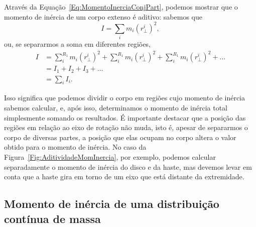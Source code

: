 Através da Equação~\ref{Eq:MomentoInerciaConjPart}, podemos mostrar que o momento de inércia de um corpo extenso é aditivo: sabemos que
\begin{equation}
    I = \sum_i m_i (r_\perp^i)^2,
\end{equation}
%
ou, se separarmos a soma em diferentes regiões,
\begin{align}
    I &= \sum_{i}^{R_1} m_i (r_\perp^i)^2 + \sum_{i}^{R_1} m_i (r_\perp^i)^2 + \sum_{i}^{R_1} m_i (r_\perp^i)^2 + \dots \\
    &= I_1 + I_2 + I_3 + \dots \\
    &= \sum_i I_i.
\end{align}

Isso significa que podemos dividir o corpo em regiões cujo momento de inércia sabemos calcular, e, após isso, determinamos o momento de inércia total simplesmente somando os resultados. É importante destacar que a posição das regiões em relação ao eixo de rotação não muda, isto é, apesar de separarmos o corpo de diversas partes, a posição que elas ocupam no corpo altera o valor obtido para o momento de inércia. No caso da Figura~\ref{Fig:AditividadeMomInercia}, por exemplo, podemos calcular separadamente o momento de inércia do disco e da haste, mas devemos levar em conta que a haste gira em torno de um eixo que está distante da extremidade.

\subsection{Momento de inércia de uma distribuição contínua de massa}

